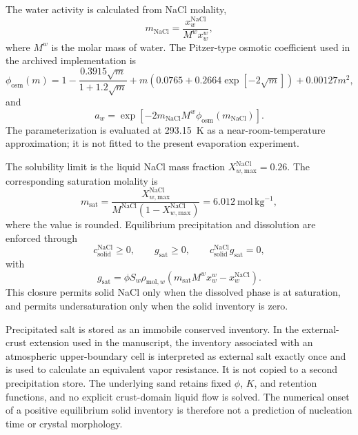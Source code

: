 \documentclass[draft,wrr]{agutexSI2019}
\begin{document}
\begin{article}
The water activity is calculated from NaCl molality,
\begin{equation}
m_{\mathrm{NaCl}}
=\frac{x_w^{\mathrm{NaCl}}}{M^w x_w^w},
\label{eq:si-molality}
\end{equation}
where $M^w$ is the molar mass of water. The Pitzer-type osmotic coefficient
used in the archived implementation is \cite{Pitzer1973}
\begin{equation}
\phi_{\mathrm{osm}}(m)=
1-\frac{0.3915\sqrt{m}}{1+1.2\sqrt{m}}
+m\left(0.0765+0.2664\exp[-2\sqrt{m}]\right)
+0.00127m^2,
\label{eq:si-osmotic-coefficient}
\end{equation}
and
\begin{equation}
a_w=\exp\left[-2m_{\mathrm{NaCl}}M^w
\phi_{\mathrm{osm}}(m_{\mathrm{NaCl}})\right].
\label{eq:si-water-activity}
\end{equation}
The parameterization is evaluated at 293.15~K as a near-room-temperature
approximation; it is not fitted to the present evaporation experiment.

The solubility limit is the liquid NaCl mass fraction
$X_{w,\mathrm{max}}^{\mathrm{NaCl}}=0.26$. The corresponding saturation
molality is
\begin{equation}
m_{\mathrm{sat}}
=\frac{X_{w,\mathrm{max}}^{\mathrm{NaCl}}}
{M^{\mathrm{NaCl}}\left(1-X_{w,\mathrm{max}}^{\mathrm{NaCl}}\right)}
=6.012~\mathrm{mol\,kg^{-1}},
\label{eq:si-saturation-molality}
\end{equation}
where the value is rounded. Equilibrium precipitation and dissolution are
enforced through
\begin{equation}
c_{\mathrm{solid}}^{\mathrm{NaCl}}\geq0,
\qquad
g_{\mathrm{sat}}\geq0,
\qquad
c_{\mathrm{solid}}^{\mathrm{NaCl}}g_{\mathrm{sat}}=0,
\label{eq:si-complementarity}
\end{equation}
with
\begin{equation}
g_{\mathrm{sat}}=
\phi S_w\rho_{\mathrm{mol},w}
\left(m_{\mathrm{sat}}M^w x_w^w-x_w^{\mathrm{NaCl}}\right).
\label{eq:si-saturation-gap}
\end{equation}
This closure permits solid NaCl only when the dissolved phase is at saturation,
and permits undersaturation only when the solid inventory is zero.

Precipitated salt is stored as an immobile conserved inventory. In the
external-crust extension used in the manuscript, the inventory associated with
an atmospheric upper-boundary cell is interpreted as external salt exactly
once and is used to calculate an equivalent vapor resistance. It is not copied
to a second precipitation store. The underlying sand retains fixed $\phi$, $K$,
and retention functions, and no explicit crust-domain liquid flow is solved.
The numerical onset of a positive equilibrium solid inventory is therefore not
a prediction of nucleation time or crystal morphology.


\end{article}
\end{document}
